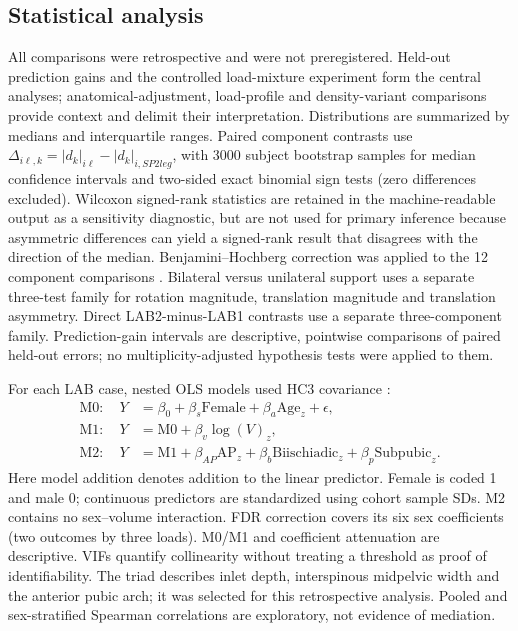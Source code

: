 \subsection{Statistical analysis}
All comparisons were retrospective and were not preregistered. Held-out prediction gains and the controlled load-mixture experiment form the central analyses; anatomical-adjustment, load-profile and density-variant comparisons provide context and delimit their interpretation. Distributions are summarized by medians and interquartile ranges. Paired component contrasts use $\Delta_{i\ell,k}=|d_k|_{i\ell}-|d_k|_{i,SP2leg}$, with 3000 subject bootstrap samples for median confidence intervals and two-sided exact binomial sign tests (zero differences excluded). Wilcoxon signed-rank statistics \citep{Wilcoxon1945} are retained in the machine-readable output as a sensitivity diagnostic, but are not used for primary inference because asymmetric differences can yield a signed-rank result that disagrees with the direction of the median. Benjamini--Hochberg correction was applied to the 12 component comparisons \citep{BenjaminiHochberg1995}. Bilateral versus unilateral support uses a separate three-test family for rotation magnitude, translation magnitude and translation asymmetry. Direct LAB2-minus-LAB1 contrasts use a separate three-component family. Prediction-gain intervals are descriptive, pointwise comparisons of paired held-out errors; no multiplicity-adjusted hypothesis tests were applied to them.

For each LAB case, nested OLS models used HC3 covariance \citep{MacKinnonWhite1985}:
\begin{align}
\mathrm{M0}:\quad Y&=\beta_0+\beta_s\mathrm{Female}+\beta_a\mathrm{Age}_z+\epsilon,\label{eq:m0}\\
\mathrm{M1}:\quad Y&=\mathrm{M0}+\beta_v\log(V)_z,\label{eq:m1}\\
\mathrm{M2}:\quad Y&=\mathrm{M1}+\beta_{AP}\mathrm{AP}_z+\beta_b\mathrm{Biischiadic}_z+\beta_p\mathrm{Subpubic}_z.\label{eq:m2}
\end{align}
Here model addition denotes addition to the linear predictor. Female is coded 1 and male 0; continuous predictors are standardized using cohort sample SDs. M2 contains no sex--volume interaction. FDR correction covers its six sex coefficients (two outcomes by three loads). M0/M1 and coefficient attenuation are descriptive. VIFs quantify collinearity without treating a threshold as proof of identifiability. The triad describes inlet depth, interspinous midpelvic width and the anterior pubic arch; it was selected for this retrospective analysis. Pooled and sex-stratified Spearman correlations are exploratory, not evidence of mediation.

